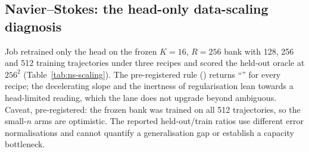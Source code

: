 \subsection{Navier--Stokes: the head-only data-scaling diagnosis}
\label{app:extended:ns-scaling}
Job \provNsScaleJob{} retrained only the head on the frozen $K=16$,
$R=256$ bank with 128, 256 and 512 training trajectories under three
recipes and scored the held-out oracle at $256^2$
(Table~\ref{tab:ns-scaling}). The pre-registered rule
(\provNsScalingBandSource) returns ``\nNsScalePlainVerdict'' for every
recipe; the decelerating slope and the inertness of regularisation lean
towards a head-limited reading, which the lane does not upgrade beyond
ambiguous. Caveat, pre-registered: the frozen bank was trained on all 512
trajectories, so the small-$n$ arms are optimistic. The reported
held-out/train ratios use different error normalisations and cannot
quantify a generalisation gap or establish a capacity bottleneck.

\begin{table}[h]
\centering
\caption{Navier--Stokes head-only data scaling (job \provNsScaleJob):
held-out oracle median per recipe and training-set size, POD-16 at
matched dimension, the held-out/train ratio, the selected training step,
and the pre-registered log-log slope with its verdict (band
$\nNsScaleBandLo$ to $\nNsScaleBandHi$). The held-out/train column is a
historical mixed-normalisation ratio, not a generalisation-gap estimate.}
\label{tab:ns-scaling}
\resizebox{\linewidth}{!}{}
\end{table}

